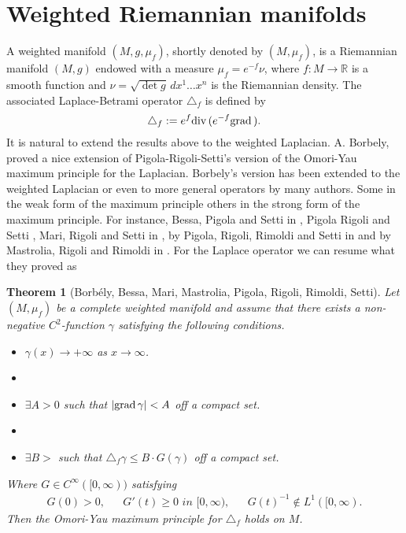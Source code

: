 \documentclass[a4paper]{amsart}
\newtheorem{theorem}{Theorem}
\begin{document}
\section{Weighted Riemannian manifolds} A weighted  manifold $(M,g,\mu_{f})$, shortly denoted by $(M,\mu_{f})$, is a Riemannian manifold  $(M, g)$  endowed with a measure $\mu_{f}=e^{-f}\nu$, where  $f\colon M\to \mathbb{R}$ is a smooth function and $\nu=\sqrt{\det g}\,dx^{1}\ldots x^{n}$ is the Riemannian density.
The associated Laplace-Betrami operator $\triangle_{f}$  is defined by $$\triangle_{f} :=e^{f}{{{\rm{div}\,}}} (e^{-f}{{{\rm{grad}\,}}} ).$$ It is natural to extend the results above to the weighted Laplacian.
 A. Borbely, \cite{borbely} \cite{borbely1} proved a nice extension of Pigola-Rigoli-Setti's version \cite{prs-memoirs} of the Omori-Yau maximum principle for the Laplacian. Borbely's version has been  extended to the weighted Laplacian or even to more general operators  by many authors. Some in the weak form of the maximum principle others in the strong form of the maximum principle.  For instance,  Bessa, Pigola and Setti in
 \cite[Thm 9]{bps-revista}, Pigola Rigoli and Setti \cite{prs-jfa},  Mari, Rigoli and Setti  in \cite{mari-rigoli-setti}, by  Pigola, Rigoli, Rimoldi and Setti in \cite{pigola-rigoli-rimoldi} and by Mastrolia, Rigoli and Rimoldi  in \cite{matrolia-rigoli-rimoldi}.  For the Laplace operator we can resume what they proved as
\begin{theorem}[Borb\'{e}ly, Bessa, Mari, Mastrolia, Pigola, Rigoli, Rimoldi, Setti]Let $(M,\mu_{f})$ be a complete weighted manifold and assume that there exists a non-negative $C^{2}$-function $\gamma$ satisfying the following conditions.
\begin{itemize}\item[a.] $\gamma (x)\to + \infty$ as $x\to \infty$.
\item[]
\item[b.]$\exists A>0$ such that  $\vert {{{\rm{grad}\,}}} \gamma \vert <A$ off a compact set.
\item[]
\item[c.]$\exists B>$ such that $\triangle_{f} \gamma \leq B\cdot G(\gamma )$ off a compact set.
\end{itemize}Where $G\in C^{\infty}([0, \infty))$ satisfying 
\begin{equation}\label{eqthm5}
\begin{array}{lllll} G(0)>0,&& G'(t)\geq 0 \,\, in\,\, [0, \infty),&& G(t)^{-1}\not \in L^{1}([0, \infty).\end{array}\end{equation}Then the Omori-Yau maximum principle for $\triangle_{f}$ holds on $M$.\label{bps-revista}
\end{theorem}
\end{document}
